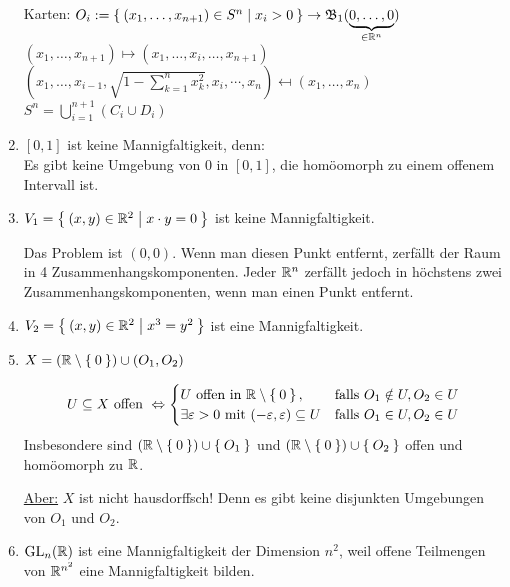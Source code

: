 \begin{beispiel}
\begin{enumerate}[label=\arabic*)]
              Karten: $O_i := \Set{(x_1, \dots, x_{n+1}) \in S^n | x_i > 0} \rightarrow \mathfrak{B}_1 (\underbrace{0, \dots, 0}_{\in \mathbb{R}^n})$\\
              $(x_1, \dots, x_{n+1}) \mapsto (x_1, \dots, x_i, \dots, x_{n+1})$\\
              $(x_1, \dots, x_{i-1}, \sqrt{1-\sum_{k=1}^n x_k^2}, x_i, \cdots, x_n)\mapsfrom (x_1, \dots, x_n)$\\
              $S^n = \bigcup_{i=1}^{n+1} (C_i \cup D_i)$
        \item $[0,1]$ ist keine Mannigfaltigkeit, denn:\\
              Es gibt keine Umgebung von $0$ in $[0,1]$, die homöomorph
              zu einem offenem Intervall ist.
        \item $V_1 = \Set{(x,y) \in \ensuremath{\mathbb{R}}^2 | x \cdot y = 0}$ ist
              keine Mannigfaltigkeit. 

              Das Problem ist $(0,0)$. Wenn man diesen Punkt entfernt,
              zerfällt der Raum in 4 Zusammenhangskomponenten.
              Jeder $\mathbb{R}^n$ zerfällt jedoch in höchstens zwei
              Zusammenhangskomponenten, wenn man einen Punkt entfernt.
        \item $V_2 = \Set{(x,y) \in \ensuremath{\mathbb{R}}^2 | x^3 = y^2}$ ist eine
              Mannigfaltigkeit.
        \item $X = (\mathbb{R} \setminus \Set{0}) \cup (O_1, O_2)$

              \[U \subseteq X \text{ offen } \Leftrightarrow 
                \begin{cases}
                    U \text{ offen in } \mathbb{R} \setminus \Set{0}, &\text{falls } O_1 \notin U, O_2 \in U\\
                    \exists \varepsilon > 0 \text{ mit } (-\varepsilon, \varepsilon) \subseteq U &\text{falls } O_1 \in U, O_2 \in U
                \end{cases}\]
              Insbesondere sind $(\mathbb{R} \setminus \Set{0}) \cup \Set{O_1}$
              und $(\mathbb{R} \setminus \Set{0}) \cup \Set{O_2}$ offen und
              homöomorph zu $\mathbb{R}$.

              \underline{Aber:} $X$ ist nicht hausdorffsch!
              Denn es gibt keine disjunkten Umgebungen von $O_1$ und
              $O_2$.
        \item $\mathrm{GL}_n(\mathbb{R})$ ist eine Mannigfaltigkeit der Dimension 
              $n^2$, weil offene Teilmengen von $\mathbb{R}^{n^2}$ eine
              Mannigfaltigkeit bilden.
    \end{enumerate}
\end{beispiel}

